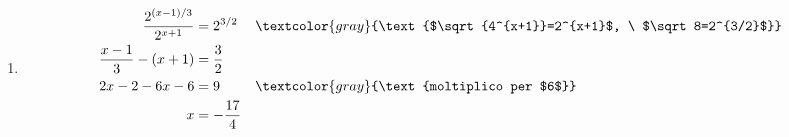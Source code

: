\begin{question}[ID=3.4, subtitle={Equazioni con radicali e raccoglimento}, difficulty=media, tags={equazioni, esponenziali, radicali, raccoglimento}]
\begin{explanation}
\begin{enumerate}
\[\begin{aligned}
    5^{x-1}(5^2-5+1) &= 105\\
    21\cdot5^{x-1} &= 105 \;\Rightarrow\; 5^{x-1}=5 \;\Rightarrow\; x=2
    \end{aligned}\]
    \item \[\begin{aligned}
    \dfrac{2^{(x-1)/3}}{2^{x+1}} &= 2^{3/2} && \textcolor{gray}{\text{$\sqrt{4^{x+1}}=2^{x+1}$, \ $\sqrt8=2^{3/2}$}}\\
    \dfrac{x-1}{3}-(x+1) &= \dfrac32\\
    2x-2-6x-6 &= 9 && \textcolor{gray}{\text{moltiplico per $6$}}\\
    x &= -\dfrac{17}{4}
    \end{aligned}\]
\end{enumerate}
\end{explanation}
\end{question}


